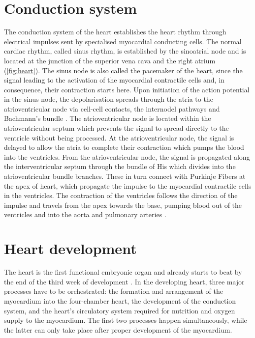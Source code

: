 \section{Conduction system}
The conduction system of the heart establishes the heart rhythm through electrical impulses sent by specialised myocardial conducting cells. The normal cardiac rhythm, called sinus rhythm, is established by the sinoatrial node and is located at the junction of the superior vena cava and the right atrium (\cref{fig:heart}). The sinus node is also called the pacemaker of the heart, since the signal leading to the activation of the myocardial contractile cells and, in consequence, their contraction starts here. Upon initiation of the action potential in the sinus node, the depolarisation spreads through the atria to the atrioventricular node via cell-cell contacts, the internodel pathways and Bachmann's bundle \citep{Laske2005,Anderson2009}. The atrioventricular node is located within the atrioventricular septum which prevents the signal to spread directly to the ventricle without being processed. At the atrioventricular node, the signal is delayed to allow the atria to complete their contraction which pumps the blood into the ventricles. From the atrioventricular node, the signal is propagated along the interventricular septum through the bundle of His which divides into the atrioventricular bundle branches. These in turn connect with Purkinje Fibers at the apex of heart, which propagate the impulse to the myocardial contractile cells in the ventricles. The contraction of the ventricles follows the direction of the impulse and travels from the apex towards the base, pumping blood out of the ventricles and into the aorta and pulmonary arteries \citep{Laske2005,Sigg2010}.  

\section{Heart development}
\label{section:heart-development}
The heart is the first functional embryonic organ and already starts to beat by the end of the third week of development \citep{Zambrano2002}. In the developing heart, three major processes have to be orchestrated: the formation and arrangement of the myocardium into the four-chamber heart, the development of the conduction system, and the heart's circulatory system required for nutrition and oxygen supply to the myocardium. The first two processes happen simultaneously, while the latter can only take place after proper development of the myocardium. 

